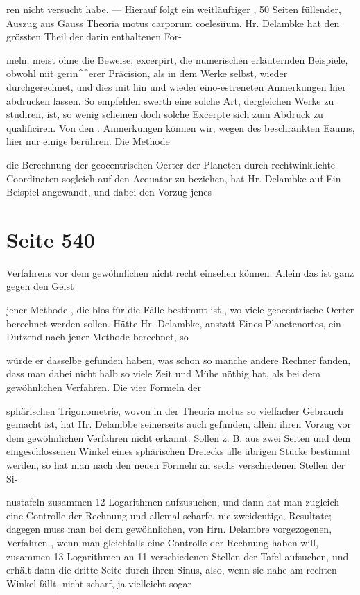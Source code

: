 \documentclass[10pt,a4paper]{article}
\begin{document}
ren nicht versucht habe. — Hierauf folgt ein weitläuftiger , 50 Seiten füllender, Auszug aus Gauss Theoria motus carporum coelesiium. Hr. Delambke hat den grössten Theil der darin enthaltenen For-

meln, meist ohne die Beweise, excerpirt, die numerischen erläuternden Beispiele, obwohl mit gerin\textasciicircum{}\textasciicircum{}erer Präcision, als in dem Werke selbst, wieder durchgerechnet, und dies mit hin und wieder eino-estreneten Anmerkungen hier abdrucken lassen. So empfehlen swerth eine solche Art, dergleichen Werke zu studiren, ist, so wenig scheinen doch solche Excerpte sich zum Abdruck zu qualificiren. Von den . Anmerkungen können wir, wegen des beschränkten Eaums, hier nur einige berühren. Die Methode

die Berechnung der geocentrischen Oerter der Planeten durch rechtwinklichte Coordinaten sogleich auf den Aequator zu beziehen, hat Hr. Delambke auf Ein Beispiel angewandt, und dabei den Vorzug jenes


\newpage
\section*{Seite 540}
Verfahrens vor dem gewöhnlichen nicht recht einsehen können. Allein das ist ganz gegen den Geist

jener Methode , die blos für die Fälle bestimmt ist , wo viele geocentrische Oerter berechnet werden sollen. Hätte Hr. Delambke, anstatt Eines Planetenortes, ein Dutzend nach jener Methode berechnet, so

würde er dasselbe gefunden haben, was schon so manche andere Rechner fanden, dass man dabei nicht halb so viele Zeit und Mühe nöthig hat, als bei dem gewöhnlichen Verfahren. Die vier Formeln der

sphärischen Trigonometrie, wovon in der Theoria motus so vielfacher Gebrauch gemacht ist, hat Hr. Delambbe seinerseits auch gefunden, allein ihren Vorzug vor dem gewöhnlichen Verfahren nicht erkannt. Sollen z. B. aus zwei Seiten und dem eingeschlossenen Winkel eines sphärischen Dreiecks alle übrigen Stücke bestimmt werden, so hat man nach den neuen Formeln an sechs verschiedenen Stellen der Si-

nustafeln zusammen 12 Logarithmen aufzusuchen, und dann hat man zugleich eine Controlle der Rechnung und allemal scharfe, nie zweideutige, Resultate; dagegen muss man bei dem gewöhnlichen, von Hrn. Delambre vorgezogenen, Verfahren , wenn man gleichfalls eine Controlle der Rechnung haben will, zusammen 13 Logarithmen an 11 verschiedenen Stellen der Tafel aufsuchen, und erhält dann die dritte Seite durch ihren Sinus, also, wenn sie nahe am rechten Winkel fällt, nicht scharf, ja vielleicht sogar
\end{document}
